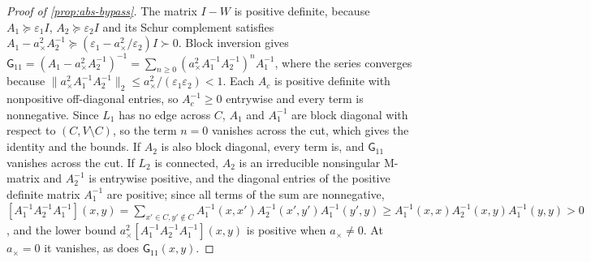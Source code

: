 \begin{proof}[Proof of \cref{prop:abs-bypass}]
The matrix $I-W$ is positive definite, because $A_1\succeq\varepsilon_1I$, $A_2\succeq\varepsilon_2I$ and its Schur complement satisfies $A_1-a_\times^2A_2^{-1}\succeq(\varepsilon_1-a_\times^2/\varepsilon_2)I\succ0$. Block inversion gives $\mathsf G_{11}=(A_1-a_\times^2A_2^{-1})^{-1}=\sum_{n\ge0}(a_\times^2A_1^{-1}A_2^{-1})^nA_1^{-1}$, where the series converges because $\lVert a_\times^2A_1^{-1}A_2^{-1}\rVert_2\le a_\times^2/(\varepsilon_1\varepsilon_2)<1$. Each $A_c$ is positive definite with nonpositive off-diagonal entries, so $A_c^{-1}\ge0$ entrywise and every term is nonnegative. Since $L_1$ has no edge across $C$, $A_1$ and $A_1^{-1}$ are block diagonal with respect to $(C,V\setminus C)$, so the term $n=0$ vanishes across the cut, which gives the identity and the bounds. If $A_2$ is also block diagonal, every term is, and $\mathsf G_{11}$ vanishes across the cut. If $L_2$ is connected, $A_2$ is an irreducible nonsingular M-matrix and $A_2^{-1}$ is entrywise positive, and the diagonal entries of the positive definite matrix $A_1^{-1}$ are positive; since all terms of the sum are nonnegative, $[A_1^{-1}A_2^{-1}A_1^{-1}](x,y)=\sum_{x'\in C,y'\notin C}A_1^{-1}(x,x')A_2^{-1}(x',y')A_1^{-1}(y',y)\ge A_1^{-1}(x,x)A_2^{-1}(x,y)A_1^{-1}(y,y)>0$, and the lower bound $a_\times^2[A_1^{-1}A_2^{-1}A_1^{-1}](x,y)$ is positive when $a_\times\ne0$. At $a_\times=0$ it vanishes, as does $\mathsf G_{11}(x,y)$.
\end{proof}

